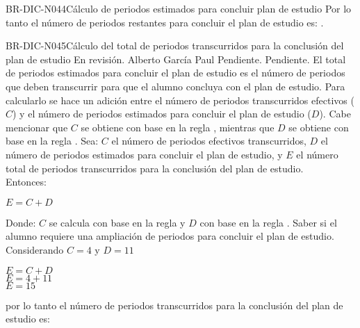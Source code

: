 \begin{BusinessRule}{BR-DIC-N044}{Cálculo de periodos estimados para concluir plan de estudio}
	Por lo tanto el número de periodos restantes para concluir el plan de estudio es: .
\end{BusinessRule}

\begin{BusinessRule}{BR-DIC-N045}{Cálculo del total de periodos transcurridos para la conclusión del plan de estudio}
	{\bcCondition} %
	{\btTimer}     %
	{\blInfluencing}     %
	\BRItem[Estado] En revisión.
	  Alberto García Paul
	 Pendiente.
	 Pendiente.
	\BRItem[Descripción] El total de periodos estimados para concluir el plan de estudio es el número de periodos que deben transcurrir para que el alumno concluya con el plan de estudio. Para calcularlo se hace un adición entre el número de periodos transcurridos efectivos ($C$) y el número de periodos estimados para concluir el plan de estudio ($D$). Cabe mencionar que $C$ se obtiene con base en la regla , mientras que $D$ se obtiene con base en la regla . 
	\BRItem[Sentencia] \cdtEmpty
	Sea: $C$ el número de periodos efectivos transcurridos, $D$ el número de periodos estimados para concluir el plan de estudio, y $E$ el número total de periodos transcurridos para la conclusión del plan de estudio. \\
	Entonces:
	\begin{center}
		$E = C + D$
	\end{center} 
	Donde: $C$ se calcula con base en la regla  y $D$ con base en la regla .
	\BRItem[Motivación] Saber si el alumno requiere una ampliación de periodos para concluir el plan de estudio.
	\BRItem[Ejemplo 1] \cdtEmpty
	Considerando $C = 4$ y $D = 11$ 
	\begin{center}
		$E = C + D$ \\
		$E = 4 + 11$ \\
		$E = 15$
	\end{center}
	por lo tanto el número de periodos transcurridos para la conclusión del plan de estudio es: 
\end{BusinessRule}

